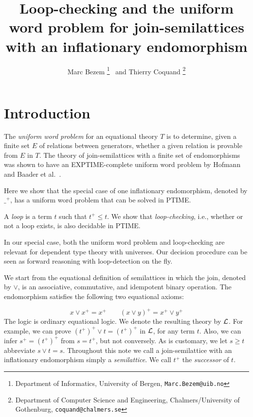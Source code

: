 \documentclass[11pt,a4paper]{article}
\newcommand\lathy{{\cal L}}
\newcommand{\FYI}[1]{{\color{red}#1}}
\begin{document}
\title{Loop-checking and the uniform word problem
for join-semilattices with an inflationary endomorphism}

\author{Marc Bezem%
\thanks{Department of Informatics, University of Bergen, {\tt Marc.Bezem@uib.no}}
~and Thierry Coquand
\thanks{Department of Computer Science and Engineering, 
Chalmers/University of Gothenburg, {\tt coquand@chalmers.se}}
}
\date{}


\maketitle


\section{Introduction}\label{sec:intro}
The \emph{uniform word problem} for an equational theory $T$ is
to determine, given a finite set $E$ of relations between generators,
whether a given relation is provable from $E$ in $T$.
The theory of join-semilattices with a finite set of endomorphisms
was shown to have an EXPTIME-complete uniform word problem by 
Hofmann \cite{Hofmann} and Baader et al.\ \cite{Baader}.

Here we show that the special case of one inflationary endomorphism,
denoted by ${\_}^+$,
has a uniform word problem that can be solved in PTIME. 

A \emph{loop} is a term $t$ such that $t^+ \leqslant t$.
We show that \emph{loop-checking}, i.e., whether or not a loop exists,
is also decidable in PTIME.

In our special case, both the uniform word problem and loop-checking are 
relevant for dependent type theory with universes. Our decision procedure
can be seen as forward reasoning with loop-detection on the fly.

We start from the equational definition of semilattices in which the
join, denoted by $\vee$, is an associative, commutative, and idempotent
binary operation. 
The endomorphism satisfies the following two equational axioms:

\[
x \vee x^+ = x^+ \quad \quad (x\vee y)^+ = x^+ \vee y^+
\] 
The logic is ordinary equational logic.
We denote the resulting theory by $\lathy$.
For example, we can prove $(t^+)^+ \vee t = (t^+)^+$ in $\lathy$,
for any term $t$. Also, we can infer $s^+ = (t^+)^+$
from $s = t^+$, but not conversely. 
As is customary, we let $s\geqslant t$ abbreviate $s\vee t = s$.
\FYI{Throughout this note we call a join-semilattice with an inflationary 
endomorphism simply a \emph{semilattice}. 
We call ${t}^+$ the \emph{successor} of $t$.}
\end{document}
